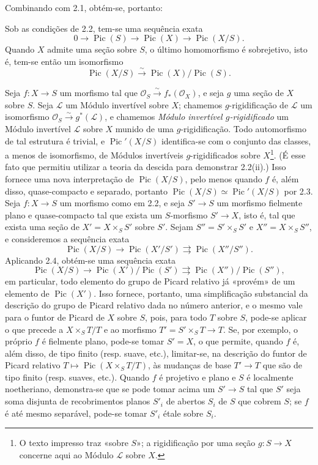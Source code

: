 Combinando com 2.1, obtém-se, portanto:

 Sob as condições de 2.2, tem-se uma sequência exata
\[
0\longrightarrow\operatorname{Pic}(S)\longrightarrow\operatorname{Pic}(X)
\longrightarrow\operatorname{Pic}(X/S).
\]
Quando $X$ admite uma seção sobre $S$, o último homomorfismo é sobrejetivo,
isto é, tem-se então um isomorfismo
\[
\operatorname{Pic}(X/S)\xrightarrow{\sim}
\operatorname{Pic}(X)/\operatorname{Pic}(S).
\]

 Seja $f:X\longrightarrow S$ um morfismo tal que
$\mathcal O_S\xrightarrow{\sim}f_*(\mathcal O_X)$, e seja $g$ uma seção de
$X$ sobre $S$. Seja $\mathcal L$ um Módulo invertível sobre $X$; chamemos
$g$-rigidificação de $\mathcal L$ um isomorfismo
$\mathcal O_S\xrightarrow{\sim}g^*(\mathcal L)$, e chamemos \emph{Módulo
invertível $g$-rigidificado} um Módulo invertível $\mathcal L$ sobre $X$ munido
de uma $g$-rigidificação. Todo automorfismo de tal estrutura é trivial, e
$\operatorname{Pic}'(X/S)$ identifica-se com o conjunto das classes, a menos de
isomorfismo, de Módulos invertíveis $g$-rigidificados sobre $X$\footnote{O
texto impresso traz «sobre $S$»; a rigidificação por uma seção $g:S\to X$
concerne aqui ao Módulo $\mathcal L$ sobre $X$.}. (É esse fato que permitiu
utilizar a teoria da descida para demonstrar 2.2(ii).) Isso fornece uma nova
interpretação de $\operatorname{Pic}(X/S)$, pelo menos quando $f$ é, além disso,
quase-compacto e separado, portanto
$\operatorname{Pic}(X/S)\simeq\operatorname{Pic}'(X/S)$ por 2.3.
 Seja $f:X\longrightarrow S$ um morfismo como em
2.2, e seja $S'\longrightarrow S$ um morfismo fielmente plano e
quase-compacto tal que exista um $S$-morfismo $S'\longrightarrow X$, isto é,
tal que exista uma seção de $X'=X\times_SS'$ sobre $S'$. Sejam
$S''=S'\times_SS'$ e $X''=X\times_SS''$, e consideremos a sequência exata
\[
\operatorname{Pic}(X/S)\longrightarrow\operatorname{Pic}(X'/S')
\rightrightarrows\operatorname{Pic}(X''/S'').
\]
Aplicando 2.4, obtém-se uma sequência exata
\[
\operatorname{Pic}(X/S)\longrightarrow
\operatorname{Pic}(X')/\operatorname{Pic}(S')
\rightrightarrows
\operatorname{Pic}(X'')/\operatorname{Pic}(S''),
\]
em particular, todo elemento do grupo de Picard relativo já «provém» de um
elemento de $\operatorname{Pic}(X')$. Isso fornece, portanto, uma simplificação
substancial da descrição do grupo de Picard relativo dada no número anterior,
e o mesmo vale para o funtor de Picard de $X$ sobre $S$, pois, para todo $T$
sobre $S$, pode-se aplicar o que precede a $X\times_ST/T$ e ao morfismo
$T'=S'\times_ST\longrightarrow T$. Se, por exemplo, o próprio $f$ é fielmente
plano, pode-se tomar $S'=X$, o que permite, quando $f$ é, além disso, de tipo
finito (resp. suave, etc.), limitar-se, na descrição do funtor de Picard relativo
$T\longmapsto\operatorname{Pic}(X\times_ST/T)$, às mudanças de base
$T'\longrightarrow T$ que são de tipo finito (resp. suaves, etc.). Quando $f$
é projetivo e plano e $S$ é localmente noetheriano, demonstra-se que se pode
tomar acima um $S'\longrightarrow S$ tal que $S'$ seja soma disjunta de
recobrimentos planos $S'_i$ de abertos $S_i$ de $S$ que cobrem $S$; se $f$ é
até mesmo separável, pode-se tomar $S'_i$ étale sobre $S_i$.

